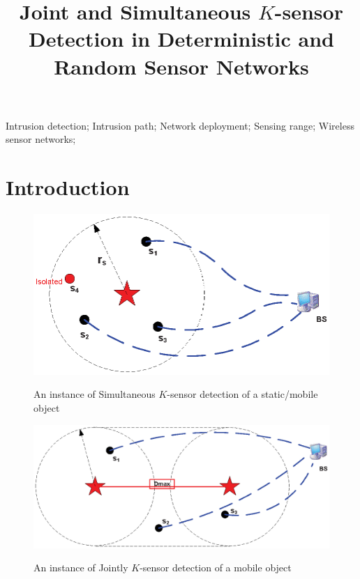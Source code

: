 \documentclass[10pt, conference, compsocconf, twocolumn]{IEEEtran}
\begin{document}
\title{Joint and Simultaneous $K$-sensor Detection in Deterministic and Random Sensor Networks}

\author{
}
\maketitle


\begin{abstract}

\end{abstract}

\begin{IEEEkeywords}
Intrusion detection; Intrusion path; Network deployment; Sensing
range; Wireless sensor networks; \\
\end{IEEEkeywords}

\IEEEpeerreviewmaketitle

\section{Introduction}

\begin{figure} [b]
  \centering
  \includegraphics[width=2.8 in]{SimultaneousKDetection.eps}\\
  \caption{An instance of Simultaneous $K$-sensor detection of a static/mobile object}\label{SimultaneousKDetection.eps}
\end{figure}
\begin{figure} [t]
  \centering
  \includegraphics[width=3.2 in]{JointKDetection.eps}\\
  \caption{An instance of Jointly $K$-sensor detection of a mobile object}\label{JointKDetection.eps}
\end{figure}
\end{document}
